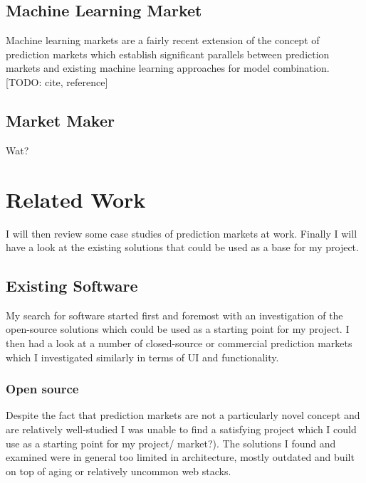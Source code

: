 \documentclass[bsc,frontabs,twoside,singlespacing,parskip,deptreport]{infthesis}     %
\begin{document}
\section{Machine Learning Market}
    Machine learning markets are a fairly recent extension of the concept of prediction markets which establish significant parallels between prediction markets and existing machine learning approaches for model combination.  [TODO: cite, reference]
 
\section{Market Maker}
    Wat?

\chapter{Related Work}

I will then review some case studies of prediction markets at work. Finally I will have a look at the existing solutions that could be used as a base for my project.

\section{Existing Software}
%
    My search for software started first and foremost with an investigation of the open-source solutions which could be used as a starting point for my project. I then had a look at a number of closed-source or commercial prediction markets which I investigated similarly in terms of UI and functionality.   
    
\subsection{Open source}
    Despite the fact that prediction markets are not a particularly novel concept and are relatively well-studied I was unable to find a satisfying project which I could use as a starting point for my project/ market?). The solutions I found and examined were in general too limited in architecture, mostly outdated and built on top of aging or relatively uncommon web stacks.
\end{document}
